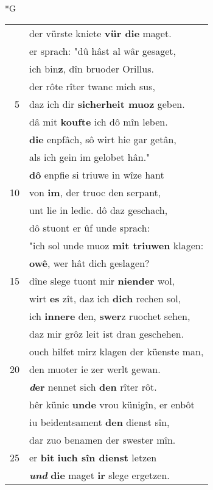 \documentclass[8pt,a4paper,notitlepage]{article}
\begin{document}
\begin{table}[ht]
\begin{minipage}[t]{0.5\linewidth}
\small
\begin{center}*G
\end{center}
\begin{tabular}{rl}
 & der vürste kniete \textbf{vür die} maget.\\ 
 & er sprach: "dû hâst al wâr gesaget,\\ 
 & ich bin\textbf{z}, dîn bruoder Orillus.\\ 
 & der rôte rîter twanc mich sus,\\ 
5 & daz ich dir \textbf{sicherheit muoz} geben.\\ 
 & dâ mit \textbf{koufte} ich dô mîn leben.\\ 
 & \textbf{die} enpfâch, sô wirt hie gar getân,\\ 
 & als ich gein im gelobet hân."\\ 
 & \textbf{dô} enpfie si triuwe in wîze hant\\ 
10 & von \textbf{im}, der truoc den serpant,\\ 
 & unt lie in ledic. dô daz geschach,\\ 
 & dô stuont er ûf unde sprach:\\ 
 & "ich sol unde muoz \textbf{mit triuwen} klagen:\\ 
 & \textbf{owê}, wer hât dich geslagen?\\ 
15 & dîne slege tuont mir \textbf{niender} wol,\\ 
 & wirt \textbf{es} zît, daz ich \textbf{dich} rechen sol,\\ 
 & ich \textbf{innere} den, \textbf{swer}z ruochet sehen,\\ 
 & daz mir grôz leit ist dran geschehen.\\ 
 & ouch hilfet mirz klagen der küenste man,\\ 
20 & den muoter ie zer werlt gewan.\\ 
 & \textbf{\textit{d}er} nennet sich \textbf{den} rîter rôt.\\ 
 & hêr künic \textbf{unde} vrou künigîn, er enbôt\\ 
 & iu beidentsament \textbf{den} dienst sîn,\\ 
 & dar zuo benamen der swester mîn.\\ 
25 & er \textbf{bit} \textbf{iuch sîn dienst} letzen\\ 
 & \textit{\textbf{und}} \textbf{die} maget \textbf{ir} slege ergetzen.\\ 

\end{tabular}
\end{minipage}
\end{table}
\end{document}
